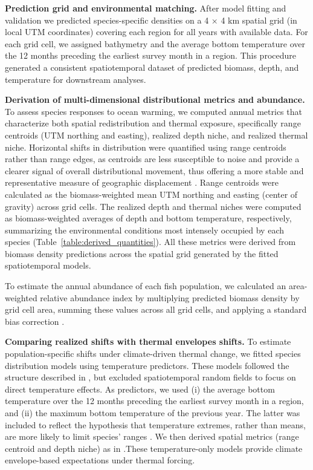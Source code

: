 \documentclass[lineno,pdflatex,sn-nature]{sn-jnl}%
\begin{document}
\textbf{Prediction grid and environmental matching.} 
After model fitting and validation we predicted species-specific densities on a 4 × 4 km spatial
grid (in local UTM coordinates) covering each region for all years with available data. For each grid cell, we assigned bathymetry and the average bottom temperature over the 12 months preceding the earliest survey month in a region. This procedure generated a consistent spatiotemporal dataset of predicted biomass, depth, and temperature for downstream analyses.

\textbf{Derivation of multi-dimensional distributional metrics and abundance.} To assess species responses to ocean warming, we computed annual metrics that characterize both spatial redistribution and thermal exposure, specifically range centroids (UTM northing and easting), realized depth niche, and realized thermal niche. Horizontal shifts in distribution were quantified using range centroids rather than range edges, as centroids are less susceptible to noise and provide a clearer signal of overall distributional movement, thus offering a more stable and representative measure of geographic displacement \citep{shoo_detecting_2006}. Range centroids were calculated as the biomass-weighted mean UTM northing and easting (center of gravity) across grid cells. The realized depth and thermal niches were computed as biomass-weighted averages of depth and bottom temperature, respectively, summarizing the environmental conditions most intensely occupied by each species (Table~\ref{table:derived_quantities}). All these metrics were derived from biomass density predictions across the spatial grid generated by the fitted spatiotemporal models.

To estimate the annual abundance of each fish population, we calculated an area-weighted relative abundance index by multiplying predicted biomass density by grid cell area, summing these values across all grid cells, and applying a standard bias correction \citep{thorson_geostatistical_2015, thorsonImplementingGeneric2016}.

\textbf{Comparing realized shifts with thermal envelopes shifts.}
To estimate population-specific shifts under climate-driven thermal change, we fitted species distribution models using temperature predictors. These models followed the structure described in \textit{}, but excluded spatiotemporal random fields to focus on direct temperature effects. As predictors, we used (i) the average bottom temperature over the 12 months preceding the earliest survey month in a region, and (ii) the maximum bottom temperature of the previous year. The latter was included to reflect the hypothesis that temperature extremes, rather than means, are more likely to limit species’ ranges \citep{sunday_thermal_2019}. We then derived spatial metrics (range centroid and depth niche) as in \textit{}.These temperature-only models provide climate envelope-based expectations under thermal forcing.
\end{document}
